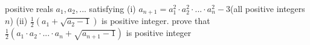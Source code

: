 positive reals $a_1, a_2, . . . $ satisfying
(i) $a_{n+1}=a_1^2\cdot a_2^2 \cdot . . . \cdot a_n^2-3$(all positive integers $n$)
(ii) $\frac{1}{2}(a_1+\sqrt{a_2-1})$ is positive integer.
prove that $\frac{1}{2}(a_1 \cdot a_2 \cdot  . . . \cdot a_n + \sqrt{a_{n+1}-1})$ is positive integer